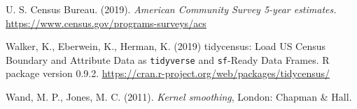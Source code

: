 \documentclass{article}
\theoremstyle{theorem}
\theoremstyle{definition}
\begin{document}
\begin{thebibliography}{3}
 U. S. Census Bureau. (2019). \textit{American Community Survey 5-year estimates.} \href{https://www.census.gov/programs-surveys/acs}{\url{https://www.census.gov/programs-surveys/acs}}

 Walker, K., Eberwein, K., Herman, K. (2019) tidycensus: Load US Census Boundary and Attribute Data as \texttt{tidyverse} and \texttt{sf}-Ready Data Frames. R package version 0.9.2. \href{https://cran.r-project.org/web/packages/tidycensus}{\url{https://cran.r-project.org/web/packages/tidycensus/}}

 Wand, M. P., Jones, M. C. (2011). \textit{Kernel smoothing}, London: Chapman \& Hall.

\end{thebibliography}
\end{document}
